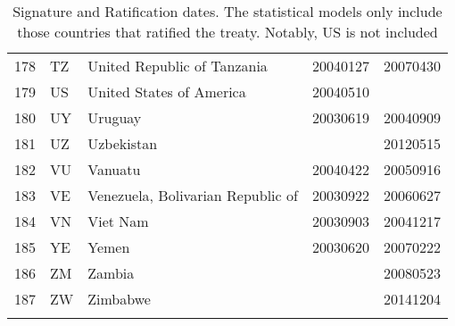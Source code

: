 \begin{longtable}{rllrr}
  178 & TZ & United Republic of Tanzania & 20040127 & 20070430 \\ 
  179 & US & United States of America & 20040510 &  \\ 
  180 & UY & Uruguay & 20030619 & 20040909 \\ 
  181 & UZ & Uzbekistan &  & 20120515 \\ 
  182 & VU & Vanuatu & 20040422 & 20050916 \\ 
  183 & VE & Venezuela, Bolivarian Republic of & 20030922 & 20060627 \\ 
  184 & VN & Viet Nam & 20030903 & 20041217 \\ 
  185 & YE & Yemen & 20030620 & 20070222 \\ 
  186 & ZM & Zambia &  & 20080523 \\ 
  187 & ZW & Zimbabwe &  & 20141204 \\ 
   \bottomrule
\caption{Signature and Ratification dates. The statistical models only include those countries that ratified the treaty. Notably, US is not included} 
\end{longtable}
